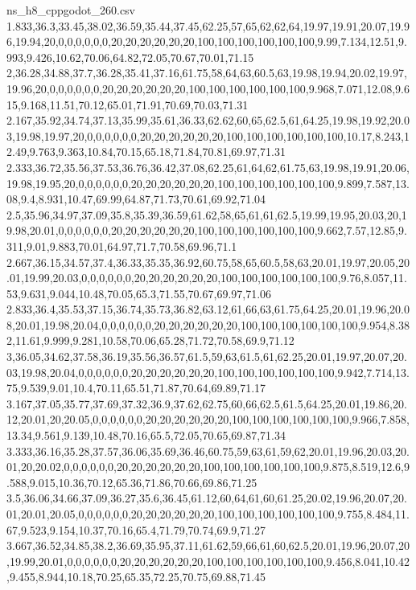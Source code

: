 \begin{filecontents*}[overwrite]{ns_h8_cppgodot_260.csv}
1.833,36.3,33.45,38.02,36.59,35.44,37.45,62.25,57,65,62,62,64,19.97,19.91,20.07,19.96,19.94,20,0,0,0,0,0,0,20,20,20,20,20,20,100,100,100,100,100,100,9.99,7.134,12.51,9.993,9.426,10.62,70.06,64.82,72.05,70.67,70.01,71.15
2,36.28,34.88,37.7,36.28,35.41,37.16,61.75,58,64,63,60.5,63,19.98,19.94,20.02,19.97,19.96,20,0,0,0,0,0,0,20,20,20,20,20,20,100,100,100,100,100,100,9.968,7.071,12.08,9.615,9.168,11.51,70.12,65.01,71.91,70.69,70.03,71.31
2.167,35.92,34.74,37.13,35.99,35.61,36.33,62.62,60,65,62.5,61,64.25,19.98,19.92,20.03,19.98,19.97,20,0,0,0,0,0,0,20,20,20,20,20,20,100,100,100,100,100,100,10.17,8.243,12.49,9.763,9.363,10.84,70.15,65.18,71.84,70.81,69.97,71.31
2.333,36.72,35.56,37.53,36.76,36.42,37.08,62.25,61,64,62,61.75,63,19.98,19.91,20.06,19.98,19.95,20,0,0,0,0,0,0,20,20,20,20,20,20,100,100,100,100,100,100,9.899,7.587,13.08,9.4,8.931,10.47,69.99,64.87,71.73,70.61,69.92,71.04
2.5,35.96,34.97,37.09,35.8,35.39,36.59,61.62,58,65,61,61,62.5,19.99,19.95,20.03,20,19.98,20.01,0,0,0,0,0,0,20,20,20,20,20,20,100,100,100,100,100,100,9.662,7.57,12.85,9.311,9.01,9.883,70.01,64.97,71.7,70.58,69.96,71.1
2.667,36.15,34.57,37.4,36.33,35.35,36.92,60.75,58,65,60.5,58,63,20.01,19.97,20.05,20.01,19.99,20.03,0,0,0,0,0,0,20,20,20,20,20,20,100,100,100,100,100,100,9.76,8.057,11.53,9.631,9.044,10.48,70.05,65.3,71.55,70.67,69.97,71.06
2.833,36.4,35.53,37.15,36.74,35.73,36.82,63.12,61,66,63,61.75,64.25,20.01,19.96,20.08,20.01,19.98,20.04,0,0,0,0,0,0,20,20,20,20,20,20,100,100,100,100,100,100,9.954,8.382,11.61,9.999,9.281,10.58,70.06,65.28,71.72,70.58,69.9,71.12
3,36.05,34.62,37.58,36.19,35.56,36.57,61.5,59,63,61.5,61,62.25,20.01,19.97,20.07,20.03,19.98,20.04,0,0,0,0,0,0,20,20,20,20,20,20,100,100,100,100,100,100,9.942,7.714,13.75,9.539,9.01,10.4,70.11,65.51,71.87,70.64,69.89,71.17
3.167,37.05,35.77,37.69,37.32,36.9,37.62,62.75,60,66,62.5,61.5,64.25,20.01,19.86,20.12,20.01,20,20.05,0,0,0,0,0,0,20,20,20,20,20,20,100,100,100,100,100,100,9.966,7.858,13.34,9.561,9.139,10.48,70.16,65.5,72.05,70.65,69.87,71.34
3.333,36.16,35.28,37.57,36.06,35.69,36.46,60.75,59,63,61,59,62,20.01,19.96,20.03,20.01,20,20.02,0,0,0,0,0,0,20,20,20,20,20,20,100,100,100,100,100,100,9.875,8.519,12.6,9.588,9.015,10.36,70.12,65.36,71.86,70.66,69.86,71.25
3.5,36.06,34.66,37.09,36.27,35.6,36.45,61.12,60,64,61,60,61.25,20.02,19.96,20.07,20.01,20.01,20.05,0,0,0,0,0,0,20,20,20,20,20,20,100,100,100,100,100,100,9.755,8.484,11.67,9.523,9.154,10.37,70.16,65.4,71.79,70.74,69.9,71.27
3.667,36.52,34.85,38.2,36.69,35.95,37.11,61.62,59,66,61,60,62.5,20.01,19.96,20.07,20,19.99,20.01,0,0,0,0,0,0,20,20,20,20,20,20,100,100,100,100,100,100,9.456,8.041,10.42,9.455,8.944,10.18,70.25,65.35,72.25,70.75,69.88,71.45

\end{filecontents*}

